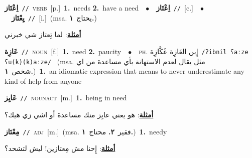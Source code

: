 \documentclass[10pt,a4paper,twoside]{article} %
\begin{document}
\begin{multicols}{2}
{\setlength\topsep{0pt}\textbf{\foreignlanguage{arabic}{اِعْتَاز}}\ {\color{gray}\texttt{//}\color{black}}\ \textsc{verb}\ [p.]\ \textbf{1.}~needs  \textbf{2.}~have a need\ \ $\bullet$\ \ \setlength\topsep{0pt}\textbf{\foreignlanguage{arabic}{اِعْتَاز}}\ {\color{gray}\texttt{//}\color{black}}\ [c.]\ \ $\bullet$\ \ \setlength\topsep{0pt}\textbf{\foreignlanguage{arabic}{يِعْتَاز}}\ {\color{gray}\texttt{//}\color{black}}\ [i.]\ \color{gray}(msa. \foreignlanguage{arabic}{يحتاج}~\foreignlanguage{arabic}{\textbf{١.}})\color{black}\  \begin{flushright}\color{gray}\foreignlanguage{arabic}{\textbf{\underline{\foreignlanguage{arabic}{أمثلة}}}: لما تِعتاز شي خبرني}\end{flushright}\color{black}} \vspace{2mm}

{\setlength\topsep{0pt}\textbf{\foreignlanguage{arabic}{عَازِة}}\ {\color{gray}\texttt{//}\color{black}}\ \textsc{noun}\ [f.]\ \textbf{1.}~need  \textbf{2.}~paucity\ \ $\bullet$\ \ \textsc{ph.} \color{gray} \foreignlanguage{arabic}{إِبن العَازِة عُكَّازِة}\color{black}\ {\color{gray}\texttt{/{\sffamily ʔibnil ʕaːze ʕu(k)(k)aːze}/}\color{black}}\ \color{gray} (msa. \foreignlanguage{arabic}{مثل يقال لعدم الاستهانة بأي مساعدة من اي شخص}~\foreignlanguage{arabic}{\textbf{١.}})\color{black}\ \textbf{1.}~an idiomatic expression that means to never underestimate any kind of help from anyone\ } \vspace{2mm}

{\setlength\topsep{0pt}\textbf{\foreignlanguage{arabic}{عَايِز}}\ {\color{gray}\texttt{//}\color{black}}\ \textsc{noun\textunderscore act}\ [m.]\ \textbf{1.}~being in need\  \begin{flushright}\color{gray}\foreignlanguage{arabic}{\textbf{\underline{\foreignlanguage{arabic}{أمثلة}}}: هو يعني عايِز منك مساعدة أو اشي زي هيك؟}\end{flushright}\color{black}} \vspace{2mm}

{\setlength\topsep{0pt}\textbf{\foreignlanguage{arabic}{مِعْتَاز}}\ {\color{gray}\texttt{//}\color{black}}\ \textsc{adj}\ [m.]\ \color{gray}(msa. \foreignlanguage{arabic}{فقير}~\foreignlanguage{arabic}{\textbf{٢.}}  \foreignlanguage{arabic}{محتاج}~\foreignlanguage{arabic}{\textbf{١.}})\color{black}\ \textbf{1.}~needy\  \begin{flushright}\color{gray}\foreignlanguage{arabic}{\textbf{\underline{\foreignlanguage{arabic}{أمثلة}}}: إِحنا مش مِعتازين! ليش لتشحد؟}\end{flushright}\color{black}} \vspace{2mm}


\end{multicols}
\end{document}
